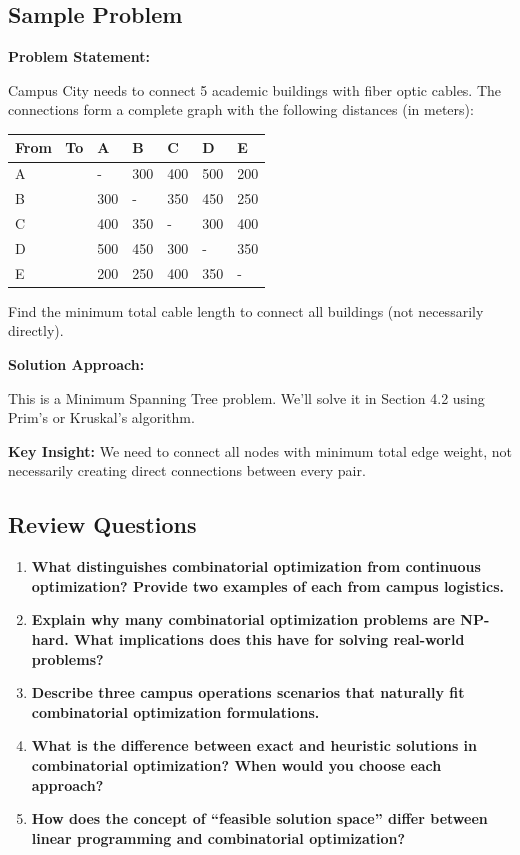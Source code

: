 \documentclass[
  letterpaper,
  DIV=11,
  numbers=noendperiod]{scrreprt}
\begin{document}
\subsection{Sample Problem}\label{sample-problem-14}

\textbf{Problem Statement:}

Campus City needs to connect 5 academic buildings with fiber optic
cables. The connections form a complete graph with the following
distances (in meters):

\begin{longtable}[]{@{}llllll@{}}
\toprule\noalign{}
From ~To & A & B & C & D & E \\
\midrule\noalign{}
\endhead
\bottomrule\noalign{}
\endlastfoot
A & - & 300 & 400 & 500 & 200 \\
B & 300 & - & 350 & 450 & 250 \\
C & 400 & 350 & - & 300 & 400 \\
D & 500 & 450 & 300 & - & 350 \\
E & 200 & 250 & 400 & 350 & - \\
\end{longtable}

Find the minimum total cable length to connect all buildings (not
necessarily directly).

\textbf{Solution Approach:}

This is a Minimum Spanning Tree problem. We'll solve it in Section 4.2
using Prim's or Kruskal's algorithm.

\textbf{Key Insight:} We need to connect all nodes with minimum total
edge weight, not necessarily creating direct connections between every
pair.

\subsection{Review Questions}\label{review-questions-12}

\begin{enumerate}
\def\labelenumi{\arabic{enumi}.}
\item
  \textbf{What distinguishes combinatorial optimization from continuous
  optimization? Provide two examples of each from campus logistics.}
\item
  \textbf{Explain why many combinatorial optimization problems are
  NP-hard. What implications does this have for solving real-world
  problems?}
\item
  \textbf{Describe three campus operations scenarios that naturally fit
  combinatorial optimization formulations.}
\item
  \textbf{What is the difference between exact and heuristic solutions
  in combinatorial optimization? When would you choose each approach?}
\item
  \textbf{How does the concept of ``feasible solution space'' differ
  between linear programming and combinatorial optimization?}
\end{enumerate}
\end{document}
